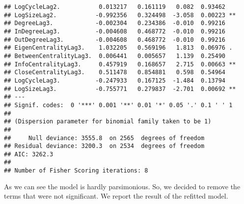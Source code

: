 \documentclass[12pt]{article}\usepackage[]{graphicx}\usepackage[]{color}
\makeatletter
\newenvironment{kframe}{%
 \def\at@end@of@kframe{}%
 \ifinner\ifhmode%
  \def\at@end@of@kframe{\end{minipage}}%
  \begin{minipage}{\columnwidth}%
 \fi\fi%
 \def\FrameCommand##1{\hskip\@totalleftmargin \hskip-\fboxsep
 \colorbox{shadecolor}{##1}\hskip-\fboxsep
     \hskip-\linewidth \hskip-\@totalleftmargin \hskip\columnwidth}%
 \MakeFramed {\advance\hsize-\width
   \@totalleftmargin\z@ \linewidth\hsize
   \@setminipage}}%
 {\par\unskip\endMakeFramed%
 \at@end@of@kframe}
\newenvironment{knitrout}{}{} %
\makeatother
\begin{document}
\begin{knitrout}
\begin{kframe}
\begin{verbatim}
## LogCycleLag2.           0.013217   0.161119   0.082  0.93462    
## LogSizeLag2.           -0.992356   0.324498  -3.058  0.00223 ** 
## DegreeLag3.            -0.002304   0.234386  -0.010  0.99216    
## InDegreeLag3.          -0.004608   0.468772  -0.010  0.99216    
## OutDegreeLag3.         -0.004608   0.468772  -0.010  0.99216    
## EigenCentralityLag3.    1.032205   0.569196   1.813  0.06976 .  
## BetweenCentralityLag3.  0.006441   0.005657   1.139  0.25490    
## InfoCentralityLag3.     0.457919   0.168657   2.715  0.00663 ** 
## CloseCentralityLag3.    0.511478   0.854881   0.598  0.54964    
## LogCycleLag3.          -0.247933   0.167125  -1.484  0.13794    
## LogSizeLag3.           -0.755771   0.279837  -2.701  0.00692 ** 
## ---
## Signif. codes:  0 '***' 0.001 '**' 0.01 '*' 0.05 '.' 0.1 ' ' 1
## 
## (Dispersion parameter for binomial family taken to be 1)
## 
##     Null deviance: 3555.8  on 2565  degrees of freedom
## Residual deviance: 3200.3  on 2534  degrees of freedom
## AIC: 3262.3
## 
## Number of Fisher Scoring iterations: 8
\end{verbatim}
\end{kframe}
\end{knitrout}

As we can see the model is hardly parsimonious. So, we decided to remove the terms that were not significant. We report the result of the refitted model.
\end{document}
